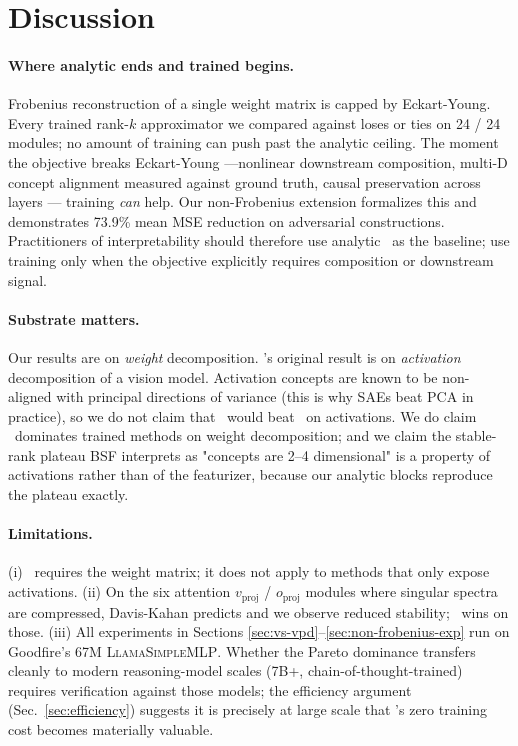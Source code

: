 \section{Discussion}
\label{sec:discussion}

\paragraph{Where analytic ends and trained begins.} Frobenius reconstruction of a single weight matrix is capped by Eckart-Young. Every trained rank-$k$ approximator we compared against loses or ties on 24 / 24 modules; no amount of training can push past the analytic ceiling. The moment the objective breaks Eckart-Young ---nonlinear downstream composition, multi-D concept alignment measured against ground truth, causal preservation across layers --- training \emph{can} help. Our non-Frobenius extension formalizes this and demonstrates 73.9\% mean MSE reduction on adversarial constructions. Practitioners of interpretability should therefore use analytic \svdomp\ as the baseline; use training only when the objective explicitly requires composition or downstream signal.

\paragraph{Substrate matters.} Our results are on \emph{weight} decomposition. \bsf's original result is on \emph{activation} decomposition of a vision model. Activation concepts are known to be non-aligned with principal directions of variance (this is why SAEs beat PCA in practice), so we do not claim that \svdomp\ would beat \bsf\ on activations. We do claim \svdomp\ dominates trained methods on weight decomposition; and we claim the stable-rank plateau BSF interprets as "concepts are 2--4 dimensional" is a property of activations rather than of the featurizer, because our analytic blocks reproduce the plateau exactly.

\paragraph{Limitations.} (i) \svdomp\ requires the weight matrix; it does not apply to methods that only expose activations. (ii) On the six attention $v_\text{proj}$ / $o_\text{proj}$ modules where singular spectra are compressed, Davis-Kahan predicts and we observe reduced stability; \vpd\ wins on those. (iii) All experiments in Sections \ref{sec:vs-vpd}--\ref{sec:non-frobenius-exp} run on Goodfire's 67M \textsc{LlamaSimpleMLP}. Whether the Pareto dominance transfers cleanly to modern reasoning-model scales (7B+, chain-of-thought-trained) requires verification against those models; the efficiency argument (Sec.\ \ref{sec:efficiency}) suggests it is precisely at large scale that \svdomp's zero training cost becomes materially valuable.

